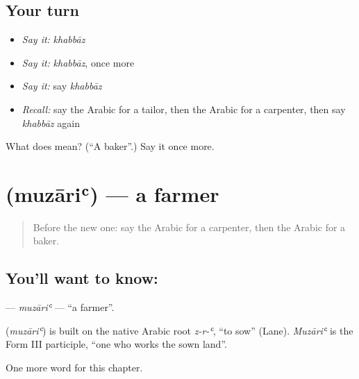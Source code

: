 \subsection*{Your turn}
\begin{itemize}
\raggedright
  \item \emph{Say it:} \emph{khabbāz}
  \item \emph{Say it:} \emph{khabbāz}, once more
  \item \emph{Say it:} say \emph{khabbāz}
  \item \emph{Recall:} say the Arabic for a tailor, then the Arabic for a carpenter, then say \emph{khabbāz} again
\end{itemize}

\begin{tcolorbox}[breakable,colback=teal!4,colframe=teal!35!black,title={Before you move on}]
What does  mean? (\textquotedblleft{}A baker\textquotedblright{}.) Say it once more.
\end{tcolorbox}
\section[\texorpdfstring{\ar{مزارع} (muzāriʿ)}{مزارع (muzāriʿ)}]{ (muzāriʿ) — a farmer}

\label{lesson:AR-C144-muzari}



\begin{quote}
Before the new one: say the Arabic for a carpenter, then the Arabic for a baker.
\end{quote}

\subsection*{You'll want to know: }
\textbf{} — \emph{muzāriʿ} — \textquotedblleft{}a farmer\textquotedblright{}.

\begin{cousinweb}
\textbf{} (\emph{muzāriʿ}) is built on the native Arabic root \emph{z-r-ʿ}, \textquotedblleft{}to sow\textquotedblright{} (Lane). \emph{Muzāriʿ} is the Form III participle, \textquotedblleft{}one who works the sown land\textquotedblright{}.
\end{cousinweb}

\begin{grammarlens}[title={What you've built}]
One more word for this chapter.
\end{grammarlens}

